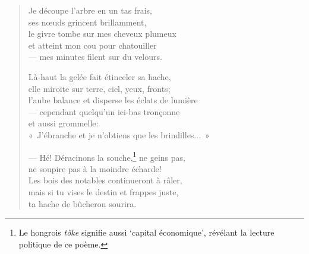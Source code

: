 \documentclass[11pt]{book}
\newcommand*{\centeredornament}{\centerline{\pgfornament[width=6cm]{88}}}
\begin{document}
\newpage

\vspace*{-15mm}
\centeredornament



\begin{verse}
  Je découpe l'arbre en un tas frais, \\
  ses nœuds grincent brillamment, \\
  le givre tombe sur mes cheveux plumeux \\
  et atteint mon cou pour chatouiller \\
  --- mes minutes filent sur du velours.

  Là-haut la gelée fait étinceler sa hache, \\
  elle miroite sur terre, ciel, yeux, fronts; \\
  l'aube balance et disperse les éclats de lumière \\
  --- cependant quelqu'un ici-bas tronçonne \\
  et aussi grommelle: \\
  «~J'ébranche et je n'obtiens que les brindilles...~»

  --- Hé! Déracinons la souche,\footnote{Le hongrois \emph{tőke}
  signifie aussi `capital économique', révélant la lecture politique
  de ce poème.} ne geins pas, \\
  ne soupire pas à la moindre écharde! \\
  Les bois des notables continueront à râler, \\
  mais si tu vises le destin et frappes juste, \\
  ta hache de bûcheron sourira.
\end{verse}

\newpage

\vspace*{-15mm}
\centeredornament


\end{document}
